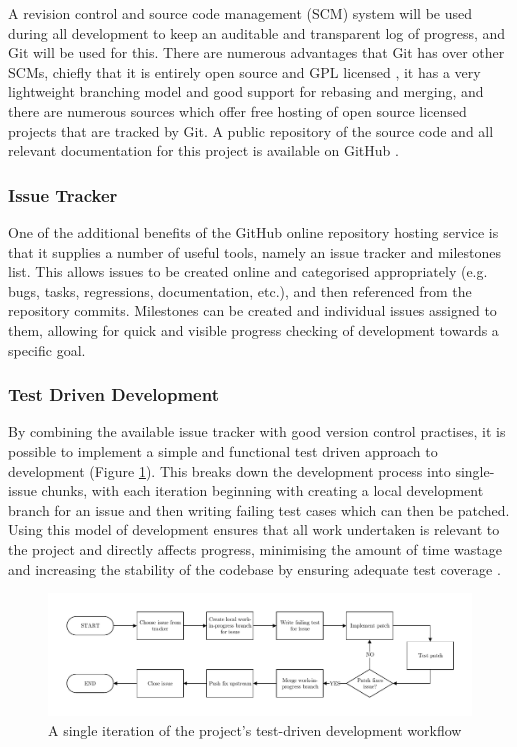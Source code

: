 A revision control and source code management (SCM) system will be used during
all development to keep an auditable and transparent log of progress, and Git
will be used for this. There are numerous advantages that Git has over other
SCMs, chiefly that it is entirely open source and GPL licensed \cite{FSF1991},
it has a very lightweight branching model and good support for rebasing and
merging, and there are numerous sources which offer free hosting of open source
licensed projects that are tracked by Git. A public repository of the source
code and all relevant documentation for this project is available on GitHub
\cite{Cummins2013}.

\subsubsection{Issue Tracker}

One of the additional benefits of the GitHub online repository hosting service
is that it supplies a number of useful tools, namely an issue tracker and
milestones list. This allows issues to be created online and categorised
appropriately (e.g. bugs, tasks, regressions, documentation, etc.), and then
referenced from the repository commits.  Milestones can be created and
individual issues assigned to them, allowing for quick and visible progress
checking of development towards a specific goal.

\subsubsection{Test Driven Development}

By combining the available issue tracker with good version control practises, it
is possible to implement a simple and functional test driven approach to
development (Figure \ref{fig:flow-tdd}). This breaks down the development
process into single-issue chunks, with each iteration beginning with creating a
local development branch for an issue and then writing failing test cases which
can then be patched. Using this model of development ensures that all work
undertaken is relevant to the project and directly affects progress, minimising
the amount of time wastage and increasing the stability of the codebase by
ensuring adequate test coverage \cite{Martin2011}.

\begin{figure}[H]
\centering
\includegraphics[width=7.5in]{assets/flow-tdd.pdf}
\caption{A single iteration of the project's test-driven development workflow}
\label{fig:flow-tdd}
\end{figure}
